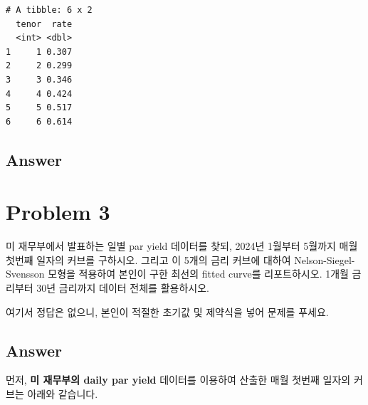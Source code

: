 \documentclass[
  a4paper,
  DIV=11,
  numbers=noendperiod]{scrreprt}
\begin{document}
\begin{verbatim}
# A tibble: 6 x 2
  tenor  rate
  <int> <dbl>
1     1 0.307
2     2 0.299
3     3 0.346
4     4 0.424
5     5 0.517
6     6 0.614
\end{verbatim}

\subsection*{Answer}\label{answer-6}

\section*{Problem 3}\label{problem-3-1}


미 재무부에서 발표하는 일별 par yield 데이터를 찾되, 2024년 1월부터
5월까지 매월 첫번째 일자의 커브를 구하시오. 그리고 이 5개의 금리 커브에
대하여 Nelson-Siegel-Svensson 모형을 적용하여 본인이 구한 최선의 fitted
curve를 리포트하시오. 1개월 금리부터 30년 금리까지 데이터 전체를
활용하시오.

여기서 정답은 없으니, 본인이 적절한 초기값 및 제약식을 넣어 문제를
푸세요.

\subsection*{Answer}\label{answer-7}

먼저, \textbf{미 재무부의 daily par yield} 데이터를 이용하여 산출한 매월
첫번째 일자의 커브는 아래와 같습니다.
\end{document}
